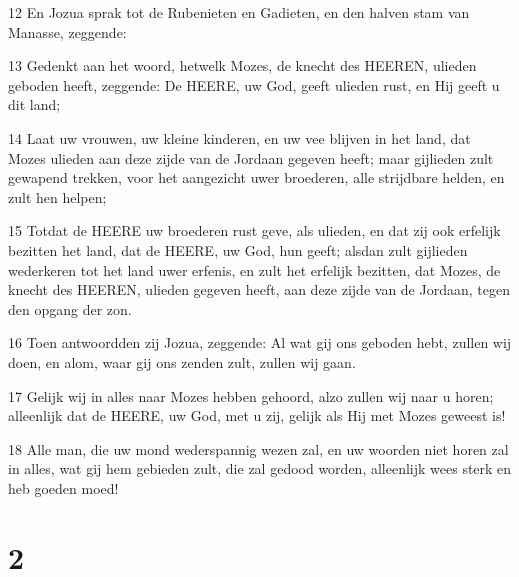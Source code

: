 \par 12 En Jozua sprak tot de Rubenieten en Gadieten, en den halven stam van Manasse, zeggende:
\par 13 Gedenkt aan het woord, hetwelk Mozes, de knecht des HEEREN, ulieden geboden heeft, zeggende: De HEERE, uw God, geeft ulieden rust, en Hij geeft u dit land;
\par 14 Laat uw vrouwen, uw kleine kinderen, en uw vee blijven in het land, dat Mozes ulieden aan deze zijde van de Jordaan gegeven heeft; maar gijlieden zult gewapend trekken, voor het aangezicht uwer broederen, alle strijdbare helden, en zult hen helpen;
\par 15 Totdat de HEERE uw broederen rust geve, als ulieden, en dat zij ook erfelijk bezitten het land, dat de HEERE, uw God, hun geeft; alsdan zult gijlieden wederkeren tot het land uwer erfenis, en zult het erfelijk bezitten, dat Mozes, de knecht des HEEREN, ulieden gegeven heeft, aan deze zijde van de Jordaan, tegen den opgang der zon.
\par 16 Toen antwoordden zij Jozua, zeggende: Al wat gij ons geboden hebt, zullen wij doen, en alom, waar gij ons zenden zult, zullen wij gaan.
\par 17 Gelijk wij in alles naar Mozes hebben gehoord, alzo zullen wij naar u horen; alleenlijk dat de HEERE, uw God, met u zij, gelijk als Hij met Mozes geweest is!
\par 18 Alle man, die uw mond wederspannig wezen zal, en uw woorden niet horen zal in alles, wat gij hem gebieden zult, die zal gedood worden, alleenlijk wees sterk en heb goeden moed!

\chapter{2}

